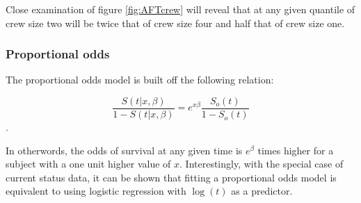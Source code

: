 \documentclass[a4paper]{article}
\begin{document}
Close examination of figure \ref{fig:AFTcrew} will reveal that at any given quantile of crew size two will be twice that of crew size four and half that of crew size one. 
    
    
    \subsubsection{Proportional odds}
  
  The proportional odds model is built off the following relation:
  
  \[
  \frac{S(t|x, \beta)}{1-S(t | x, \beta)} = e^{x \beta} \frac{S_o(t)}{1 - S_o(t)}
  \].

  In otherwords, the odds of survival at any given time is $e^{\beta}$ times higher for a subject with a one unit higher value of $x$. Interestingly, with the special case of current status data, it can be shown that fitting a proportional odds model is equivalent to using logistic regression with $\log(t)$ as a predictor. 
  
\end{document}
